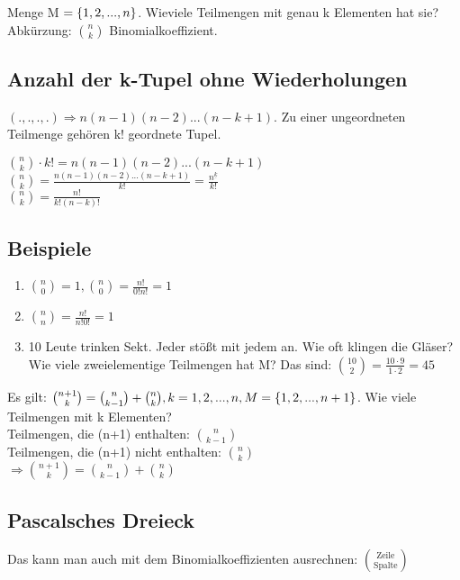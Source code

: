 Menge M $= \left\lbrace 1,2,...,n \right\rbrace $. Wieviele Teilmengen mit genau k Elementen hat sie? 
Abkürzung: $\binom{n}{k} $ Binomialkoeffizient. 

\subsection{Anzahl der k-Tupel ohne Wiederholungen}
$ (.,.,.,.) \Rightarrow n(n-1)(n-2)...(n-k+1)$. Zu einer ungeordneten Teilmenge gehören k! geordnete Tupel.

$\binom{n}{k} \cdot k! = n(n-1)(n-2)...(n-k+1)$\\
$\binom{n}{k} = \frac{n(n-1)(n-2)...(n-k+1)}{k!} = \frac{n^{\underline{k}}}{k!} $\\
$\binom{n}{k} = \frac{n!}{k! (n-k)!}$ 

\subsection{Beispiele}
\begin{enumerate}
\item $\binom{n}{0} = 1, \binom{n}{0}=\frac{n!}{0! n!} = 1$
\item $\binom{n}{n} = \frac{n!}{n! 0!} = 1$
\item 10 Leute trinken Sekt. Jeder stößt mit jedem an. Wie oft klingen die Gläser? Wie viele zweielementige Teilmengen hat M? Das sind: $\binom{10}{2}=\frac{10\cdot 9}{1\cdot 2}= 45$
\end{enumerate}

\begin{satz}
Es gilt: $\binom{n+1}{k}= \binom{n}{k-1} + \binom{n}{k}, k=1,2,...,n, M= \left\lbrace 1,2,...,n+1 \right\rbrace $. Wie viele Teilmengen mit k Elementen?\\
Teilmengen, die (n+1) enthalten: $\binom{n}{k-1}$\\
Teilmengen, die (n+1) nicht enthalten: $\binom n k $\\
$\Rightarrow \binom{n+1}{k}= \binom{n}{k-1} + \binom{n}{k}$
\end{satz}

\subsection{Pascalsches Dreieck}
Das kann man auch mit dem Binomialkoeffizienten ausrechnen: $\binom{\textrm{Zeile}}{\textrm{Spalte}}$

